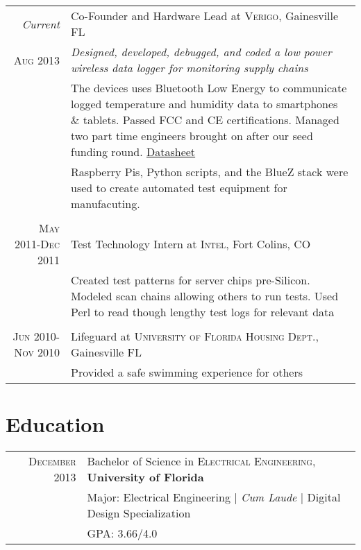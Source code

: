 \documentclass[a4paper,10pt]{article} %
\begin{document}
\begin{tabular}{r|p{11cm}}
\emph{Current} &  Co-Founder and Hardware Lead at \textsc{Verigo}, Gainesville FL \\
\textsc{Aug 2013} & \emph{Designed, developed, debugged, and coded a low power wireless data logger for monitoring supply chains}\\
&\footnotesize{The devices uses Bluetooth Low Energy to communicate logged temperature and humidity data to smartphones \& tablets. Passed FCC and CE certifications. Managed two part time engineers brought on after our seed funding round. \href{http://verigo.io/hardware.html}{Datasheet}}\\
&\footnotesize{Raspberry Pis, Python scripts, and the BlueZ stack were used to create automated test equipment for manufacuting.}\\
\multicolumn{2}{c}{} \\


\textsc{May 2011-Dec 2011} & Test Technology Intern at \textsc{Intel}, Fort Colins, CO \emph{}\\
& \footnotesize{Created test patterns for server chips pre-Silicon. Modeled scan chains allowing others to run tests. Used Perl to read though lengthy test logs for relevant data}\\
\multicolumn{2}{c}{} \\


\textsc{Jun 2010-Nov 2010} & Lifeguard at \textsc{University of Florida Housing Dept.}, Gainesville FL \emph{}\\
& \footnotesize{Provided a safe swimming experience for others}\\
\end{tabular}


\section{Education}

\begin{tabular}{rl}
\textsc{December} 2013 & Bachelor of Science in \textsc{Electrical Engineering}, \textbf{University of Florida}\\
& \small{Major: Electrical Engineering  | \emph{Cum Laude}  |  Digital Design Specialization}\\
&\normalsize \textsc{GPA}: 3.66/4.0\\


\end{tabular}
\end{document}
